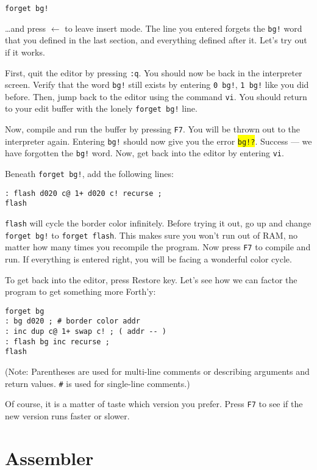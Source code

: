 \begin{verbatim}
forget bg!
\end{verbatim}

\ldots and press $\leftarrow$ to leave insert mode. The line you entered forgets the \texttt{bg!} word that you defined in the last section, and everything defined after it. Let's try out if it works.

First, quit the editor by pressing \texttt{:q}. You should now be back in the interpreter screen.
Verify that the word \texttt{bg!} still exists by  entering \texttt{0 bg!}, \texttt{1 bg!} like you did
before. Then, jump back to the editor using the command \texttt{vi}. You should return to your edit buffer with the lonely \texttt{forget bg!} line.

Now, compile and run the buffer by pressing \texttt{F7}. You will be thrown out to the interpreter
again. Entering \texttt{bg!} should now give you the error \colorbox{yellow}{\texttt{bg!?}}. Success
--- we have forgotten the \texttt{bg!} word. Now, get back into the editor by entering \texttt{vi}.

Beneath \texttt{forget bg!}, add the following lines:

\begin{verbatim}
: flash d020 c@ 1+ d020 c! recurse ;
flash
\end{verbatim}

\texttt{flash} will cycle the border color infinitely. Before trying it out, go up and change \texttt{forget bg!} to \texttt{forget flash}. This makes sure you won't run out of RAM, no matter how many times you recompile the program. Now press \texttt{F7} to compile and run. If everything is entered right, you will be facing a wonderful color cycle.

To get back into the editor, press Restore key. Let's see how we can factor the program to get something more Forth'y:

\begin{verbatim}
forget bg
: bg d020 ; # border color addr
: inc dup c@ 1+ swap c! ; ( addr -- )
: flash bg inc recurse ;
flash
\end{verbatim}

(Note: Parentheses are used for multi-line comments or describing arguments and return values. \texttt{\#} is used for single-line comments.)

Of course, it is a matter of taste which version you prefer. Press \texttt{F7} to see if the new version runs faster or slower.

\section{Assembler}

